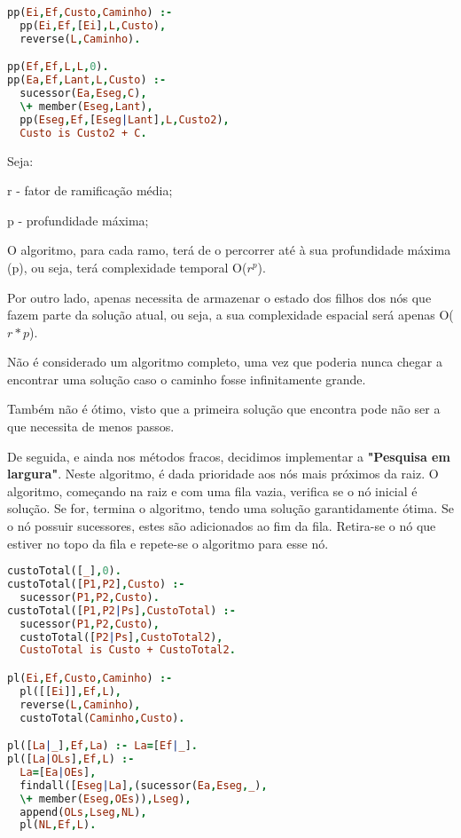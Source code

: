 \documentclass[a4paper]{article}
\begin{document}
\begin{lstlisting}[language=Prolog,xleftmargin=.15\textwidth]
pp(Ei,Ef,Custo,Caminho) :-
  pp(Ei,Ef,[Ei],L,Custo),
  reverse(L,Caminho).

pp(Ef,Ef,L,L,0).
pp(Ea,Ef,Lant,L,Custo) :-
  sucessor(Ea,Eseg,C),
  \+ member(Eseg,Lant),
  pp(Eseg,Ef,[Eseg|Lant],L,Custo2),
  Custo is Custo2 + C.
\end{lstlisting}

Seja:

r - fator de ramificação média;

p - profundidade máxima;

O algoritmo, para cada ramo, terá de o percorrer até à sua profundidade máxima (p), ou seja, terá complexidade temporal O($r ^ p$).

Por outro lado, apenas necessita de armazenar o estado dos filhos dos nós que fazem parte da solução atual, ou seja, a sua complexidade espacial será apenas O($r * p$).

Não é considerado um algoritmo completo, uma vez que poderia nunca chegar a encontrar uma solução caso o caminho fosse infinitamente grande.

Também não é ótimo, visto que a primeira solução que encontra pode não ser a que necessita de menos passos.

De seguida, e ainda nos métodos fracos, decidimos implementar a \textbf{"Pesquisa em largura"}. Neste algoritmo, é dada prioridade aos nós mais próximos da raiz. O algoritmo, começando na raiz e com uma fila vazia, verifica se o nó inicial é solução. Se for, termina o algoritmo, tendo uma solução garantidamente ótima. Se o nó possuir sucessores, estes são adicionados ao fim da fila. Retira-se o nó que estiver no topo da fila e repete-se o algoritmo para esse nó.

\begin{lstlisting}[language=Prolog,xleftmargin=.1\textwidth]
custoTotal([_],0).
custoTotal([P1,P2],Custo) :-
  sucessor(P1,P2,Custo).
custoTotal([P1,P2|Ps],CustoTotal) :-
  sucessor(P1,P2,Custo),
  custoTotal([P2|Ps],CustoTotal2),
  CustoTotal is Custo + CustoTotal2.

pl(Ei,Ef,Custo,Caminho) :-
  pl([[Ei]],Ef,L),
  reverse(L,Caminho),
  custoTotal(Caminho,Custo).

pl([La|_],Ef,La) :- La=[Ef|_].
pl([La|OLs],Ef,L) :-
  La=[Ea|OEs],
  findall([Eseg|La],(sucessor(Ea,Eseg,_),
  \+ member(Eseg,OEs)),Lseg),
  append(OLs,Lseg,NL),
  pl(NL,Ef,L).
\end{lstlisting}
\end{document}

